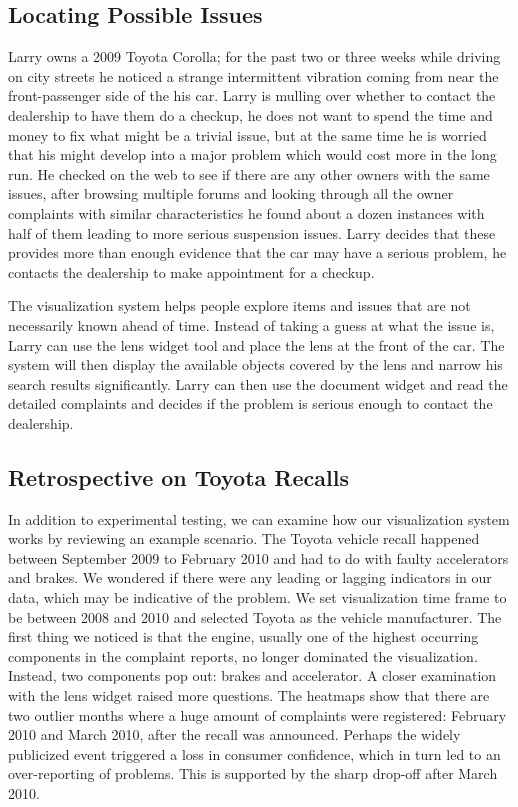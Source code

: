 \subsection{Locating Possible Issues}
Larry owns a 2009 Toyota Corolla; for the past two or three weeks while driving
on city streets he noticed a strange intermittent vibration coming from near the 
front-passenger side of the his car. Larry is mulling over whether to contact the 
dealership to have them do a checkup, he does not want to spend the time and
money to fix what might be a trivial issue, but at the same time he is worried that his 
might develop into a major problem which would cost more in the long run. He 
checked on the web to see if there are any other owners with the same issues, after 
browsing multiple forums and looking through all the owner complaints with similar 
characteristics he found about a dozen instances with half of them leading to more 
serious suspension issues. Larry decides that these provides more than enough evidence 
that the car may have a serious problem, he contacts the dealership to make 
appointment for a checkup.

The visualization system helps people explore items and issues that are not
necessarily known ahead of time. Instead of taking a guess at what the
issue is, Larry can use the lens widget tool and place the lens at the front of
the car.  The system will then display the available objects
covered by the lens and narrow his search results significantly. Larry can then
use the document widget and read the detailed complaints and decides if the
problem is serious enough to contact the dealership.


\subsection{Retrospective on Toyota Recalls}
In addition to experimental testing, we can examine how our visualization
system works by reviewing an example scenario. The Toyota
vehicle recall happened between September 2009 to February 2010
and had to do with faulty accelerators and brakes. We wondered if
there were any leading or lagging indicators in our data, which may be
indicative of the problem. We set visualization time frame to be between
2008 and 2010 and selected Toyota as the vehicle manufacturer.
The first thing we noticed is that the engine, usually one of the highest
occurring components in the complaint reports, no longer dominated
the visualization. Instead, two components pop out: brakes and accelerator.
A closer examination with the lens widget raised more questions.
The heatmaps show that there are two outlier months where a
huge amount of complaints were registered: February 2010 and March
2010, after the recall was announced. Perhaps the widely publicized
event triggered a loss in consumer confidence, which in turn led to an
over-reporting of problems. This is supported by the sharp drop-off
after March 2010.

